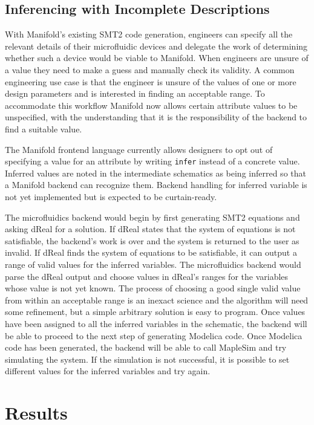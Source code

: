 \subsection{Inferencing with Incomplete Descriptions}

With Manifold's existing SMT2 code generation, engineers can specify all the
relevant details of their microfluidic devices and delegate the work of
determining whether such a device would be viable to Manifold. When engineers
are unsure of a value they need to make a guess and manually check its
validity. A common engineering use case is that the engineer is unsure of the
values of one or more design parameters and is interested in finding an
acceptable range. To accommodate this workflow Manifold now allows certain
attribute values to be unspecified, with the understanding that it is the
responsibility of the backend to find a suitable value.

The Manifold frontend language currently allows designers to opt out of
specifying a value for an attribute by writing {\tt infer} instead of a
concrete value. Inferred values are noted in the intermediate schematics as
being inferred so that a Manifold backend can recognize them. Backend handling
for inferred variable is not yet implemented but is expected to be curtain-ready.

The microfluidics backend would begin by first generating SMT2 equations and asking dReal for a solution.
If dReal states that the system of equations is not satisfiable, the backend's work is over and the system is returned to the user as invalid.
If dReal finds the system of equations to be satisfiable, it can output a range of valid values for the inferred variables.
The microfluidics backend would parse the dReal output and choose values in dReal's ranges for the variables whose value is not yet known.
The process of choosing a good single valid value from within an acceptable range is an inexact science and the algorithm will need some refinement, but a simple arbitrary solution is easy to program.
Once values have been assigned to all the inferred variables in the schematic, the backend will be able to proceed to the next step of generating Modelica code.
Once Modelica code has been generated, the backend will be able to call MapleSim and try simulating the system.
If the simulation is not successful, it is possible to set different values for the inferred variables and try again.

\section{Results}

